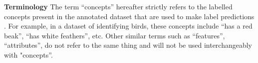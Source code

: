 \textbf{Terminology}
The term ``concepts'' hereafter strictly refers to the labelled concepts present
in the annotated dataset
that are used to make label predictions
. For example, in a dataset of identifying birds,
these concepts include ``has a red beak'', ``has white feathers'', etc.
Other similar terms such as ``features'', ``attributes'', do not refer to the same thing
and will not be used interchangeably with
"concepts''.





